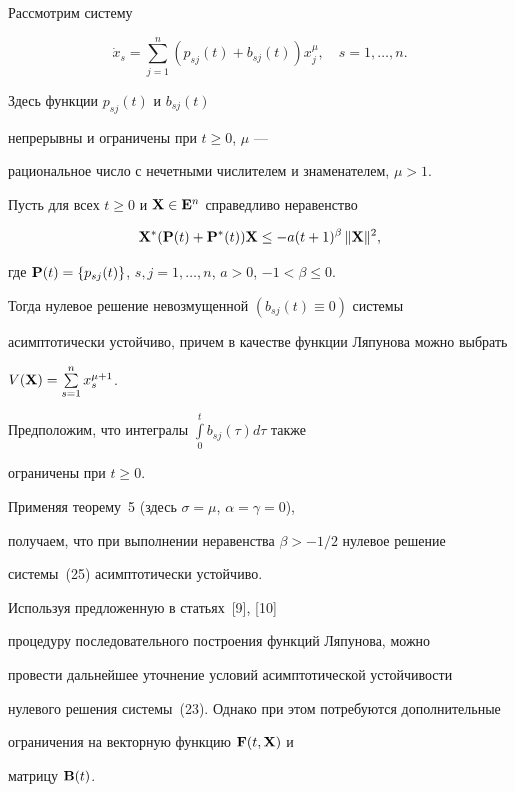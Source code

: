 \begin{exam}


Рассмотрим систему


\begin{equation}


\Dot x_s=\sum_{j=1}^n (p_{sj}(t)+b_{sj}(t)) x_j^\mu,


\quad s=1,\dotsc,n.


\end{equation}


Здесь функции $p_{sj}(t)$ и $b_{sj}(t)$


непрерывны и ограничены при $t\geq 0$, $\mu$ ---


рациональное число с нечетными числителем и знаменателем, $\mu>1$.





Пусть для всех $t\geq 0$ и $\bold X \in \bold E^n$ справедливо неравенство


$$


\bold X^* (\bold P(t)+\bold P^*(t)) \bold X \leq


-a (t+1)^\beta \, \|\bold X\|^2,


$$


где $\bold P(t)=\{p_{sj}(t)\}$, $s,j=1,\dotsc,n$, $a>0$, $-1<\beta\leq 0$.


Тогда нулевое решение невозмущенной $(b_{sj}(t)\equiv 0)$ системы


асимптотически устойчиво, причем в качестве функции Ляпунова можно выбрать


$V(\bold X)=\sum\limits_{s=1}^n x_s^{\mu+1}$.





Предположим, что интегралы $\int\limits_0^t b_{sj}(\tau) d\tau$ также


ограничены при $t\geq 0$.





Применяя теорему~5 (здесь $\sigma=\mu$, $\alpha=\gamma=0$),


получаем, что при выполнении неравенства $\beta>-1/2$ нулевое решение


системы~(25) асимптотически устойчиво.


\end{exam}





\begin{note}


Используя предложенную в статьях~[9], [10]


процедуру последовательного построения функций Ляпунова, можно


провести дальнейшее уточнение условий асимптотической устойчивости


нулевого решения системы~(23). Однако при этом потребуются дополнительные


ограничения на векторную функцию $\bold F(t, \bold X)$ и


матрицу $\bold B(t)$.


\end{note}





